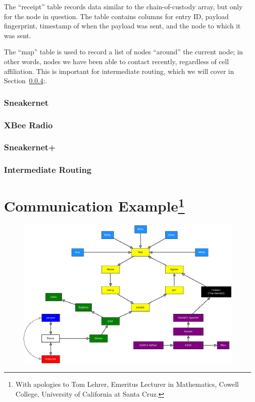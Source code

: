 \documentclass[12pt]{article}
\begin{document}
  The ``receipt'' table records data similar to the chain-of-custody array, but only for the node in question. The table contains columns for entry ID, payload fingerprint, timestamp of when the payload was sent, and the node to which it was sent.
  
  The ``map'' table is used to record a list of nodes ``around'' the current node; in other words, nodes we have been able to contact recently, regardless of cell affiliation. This is important for intermediate routing, which we will cover in Section~\ref{subsec:introuting}:. 
  
  \subsubsection{Sneakernet}
  \subsubsection{XBee Radio}
  \subsubsection{Sneakernet+}
  \subsubsection{Intermediate Routing}
  \label{subsec:introuting}
  
  \section{Communication Example\footnote{With apologies to Tom Lehrer, Emeritus Lecturer in Mathematics, Cowell College, University of California at Santa Cruz.}}
  
      \begin{figure}[h]
      \centering{}
      \includegraphics[scale=0.45]{Diagram3.png}
      \caption{ }
    \end{figure}
  
\end{document}
